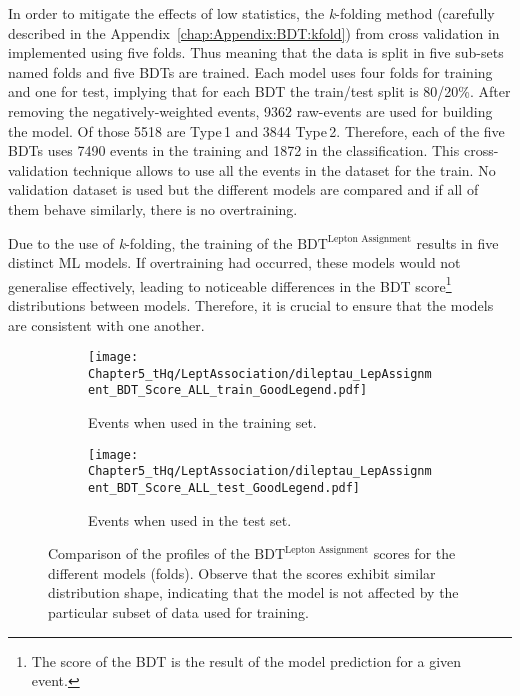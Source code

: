 In order to mitigate the effects of low statistics, the \textit{k}-folding method (carefully described in 
the Appendix~\ref{chap:Appendix:BDT:kfold}) from cross validation in implemented using five folds. 
Thus meaning that the data is split in five sub-sets named folds 
and five BDTs are trained. Each model uses four folds
for training and one for test, implying that for each BDT the train/test split is 80/20\%.
After removing the negatively-weighted events, 9362 raw-events are used for building the model.
Of those 5518 are Type$\,$1 and 3844 Type$\,$2. Therefore, each of the five BDTs uses 7490 events
in the training and 1872 in the classification.
This cross-validation technique allows to use all the events in the dataset for the train. 
No validation dataset is used but the different models
are compared and if all of them behave similarly, there is no overtraining. 

 Due to the use of \textit{k}-folding, the training of the $\text{BDT}^{\text{Lepton Assignment}}$ results 
 in five distinct ML models. If overtraining had occurred, these models would not 
 generalise effectively, leading to noticeable differences in the BDT score\footnote{The 
 score of the BDT is the result of the model prediction for a given event.} distributions 
 between models. Therefore, it is crucial to ensure that the models are consistent 
 with one another.
 
 \begin{figure}[h]
	\begin{subfigure}[h]{0.5\linewidth}
		\texttt{[image: Chapter5\_tHq/LeptAssociation/dileptau\_LepAssignment\_BDT\_Score\_ALL\_train\_GoodLegend.pdf]}
		\caption{Events when used in the training set.}
	\end{subfigure}
	\hfill
	\begin{subfigure}[h]{0.5\linewidth}
		\texttt{[image: Chapter5\_tHq/LeptAssociation/dileptau\_LepAssignment\_BDT\_Score\_ALL\_test\_GoodLegend.pdf]}
		\caption{Events when used in the test set.}
	\end{subfigure}%
	\caption{Comparison of the profiles of the  $\text{BDT}^{\text{Lepton Assignment}}$ scores for the different models (folds). 
	Observe that the scores exhibit similar distribution shape, indicating that 
	the model is not affected by the particular subset of data used for training.}
	\label{fig:ChaptH:dileptau:Assignment:ScoreDistributions}
\end{figure}

